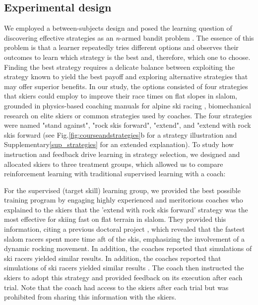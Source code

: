 \documentclass[pdflatex,sn-mathphys-num]{sn-jnl}%
\theoremstyle{thmstyleone}%
\theoremstyle{thmstyletwo}%
\theoremstyle{thmstylethree}%
\begin{document}
\subsection{Experimental design}
We employed a between-subjects design and posed the learning question of discovering effective strategies as an \textit{n}-armed bandit problem \cite{sutton_reinforcement_2018}. The essence of this problem is that a learner repeatedly tries different options and observes their outcomes to learn which strategy is the best and, therefore, which one to choose. Finding the best strategy requires a delicate balance between exploiting the strategy known to yield the best payoff and exploring alternative strategies that may offer superior benefits. In our study, the options consisted of four strategies that skiers could employ to improve their race times on flat slopes in slalom, grounded in physics-based coaching manuals for alpine ski racing \cite{lemaster_skiers_1999, lemaster_ultimate_2010, lind_physics_2013}, biomechanical research on elite skiers \cite{reid_kinematic_2010, reid_alpine_2020, magelssen_is_2022}  or common strategies used by coaches.  The four strategies were named "stand against", "rock skis forward", "extend", and "extend with rock skis forward (see Fig.\ref{fig:courseandstrategies}b for a strategy illustration and Supplementary\ref{sup_strategies} for an extended explanation). To study how instruction and feedback drive learning in strategy selection, we designed and allocated skiers to three treatment groups, which allowed us to compare reinforcement learning with traditional supervised learning with a coach: 

For the supervised (target skill) learning group, we provided the best possible training program by engaging highly experienced and meritorious coaches who explained to the skiers that the 'extend with rock skis forward' strategy was the most effective for skiing fast on flat terrain in slalom. They provided this information, citing a previous doctoral project \cite{reid_kinematic_2010}, which revealed that the fastest slalom racers spent more time aft of the skis, emphasizing the involvement of a dynamic rocking movement. In addition, the coaches reported that simulations of ski racers yielded similar results. In addition, the coaches reported that simulations of ski racers yielded similar results \cite{mote_accelerations_1983, lind_physics_2013}. The coach then instructed the skiers to adopt this strategy and provided feedback on its execution after each trial. Note that the coach had access to the skiers after each trial but was prohibited from sharing this information with the skiers.
\end{document}
